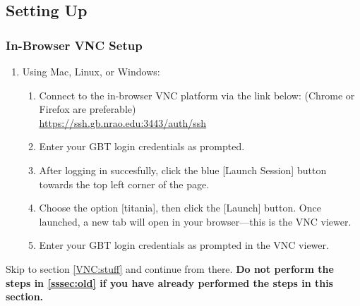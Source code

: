 \documentclass[11pt, reqno, tbtags]{article}
\begin{document}
\subsection{Setting Up}\label{ssec:qa} %
\subsubsection{In-Browser VNC Setup}\label{sssec:new} %
\begin{enumerate}
\item Using Mac, Linux, or Windows: 
 \begin{enumerate}
  \item Connect to the in-browser VNC platform via the link below: (Chrome or Firefox are preferable)\\ 
  \href{https://ssh.gb.nrao.edu:3443/auth/ssh}{https://ssh.gb.nrao.edu:3443/auth/ssh}
  \item Enter your GBT login credentials as prompted.
  \item After logging in succesfully, click the blue [Launch Session] button towards the top left corner of the page.
  \item Choose the option [titania], then click the [Launch] button. Once launched, a new tab will open in your browser---this is the VNC viewer.
  \item Enter your GBT login credentials as prompted in the VNC viewer.\\
 \end{enumerate}
\end{enumerate}

\noindent Skip to section \ref{VNC:stuff} and continue from there. {\bfseries {Do not perform the steps in \ref{sssec:old} if you have already performed the steps in this section.}}
\end{document}
